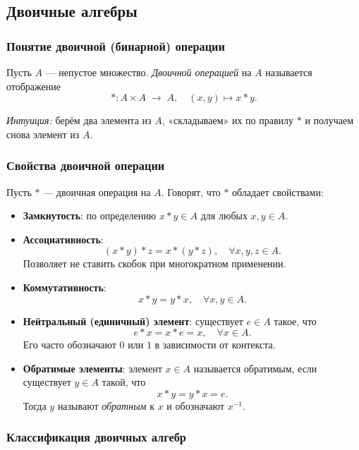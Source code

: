 \subsection{Двоичные алгебры}

\subsubsection{Понятие двоичной (бинарной) операции}

\begin{definition}
Пусть $A$ — непустое множество. \emph{Двоичной операцией} на $A$ называется отображение
\[
  * : A \times A \;\longrightarrow\; A,
  \quad (x,y)\mapsto x*y.
\]
\end{definition}

\emph{Интуиция:} берём два элемента из $A$, «складываем» их по правилу $*$ и получаем снова элемент из $A$.

\subsubsection{Свойства двоичной операции}

Пусть $*$ — двоичная операция на $A$. Говорят, что $*$ обладает свойствами:

\begin{itemize}[leftmargin=*]
  \item \textbf{Замкнутость}: по определению $x*y\in A$ для любых $x,y\in A$.
  \item \textbf{Ассоциативность}:
    \[
      (x*y)*z = x*(y*z),\quad \forall x,y,z\in A.
    \]
    Позволяет не ставить скобок при многократном применении.
  \item \textbf{Коммутативность}:
    \[
      x*y = y*x,\quad \forall x,y\in A.
    \]
  \item \textbf{Нейтральный (единичный) элемент}: существует $e\in A$ такое, что
    \[
      e*x = x*e = x,\quad \forall x\in A.
    \]
    Его часто обозначают $0$ или $1$ в зависимости от контекста.
  \item \textbf{Обратимые элементы}: элемент $x\in A$ называется обратимым, если существует $y\in A$ такой, что
    \[
      x*y = y*x = e.
    \]
    Тогда $y$ называют \emph{обратным} к $x$ и обозначают $x^{-1}$.
\end{itemize}

\subsubsection{Классификация двоичных алгебр}

